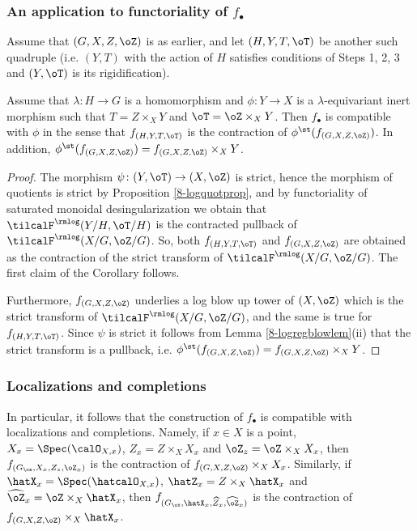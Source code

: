 \documentclass[10pt]{../fichiers-configuration-latex/smfart}
\begin{document}
\subsubsection{An application to functoriality of $f_\bullet$} Assume
that $(G,X,Z,\oZ)$ is as earlier, and let $(H,Y,T,\oT)$ be another
such quadruple (i.e. $(Y,T)$ with the action of $H$ satisfies
conditions of Steps 1, 2, 3 and $(Y,\oT)$ is its rigidification).

\begin{corollary2}\label{8-logquotcor} Assume that
$\lambda{\colon}H\to G$ is a homomorphism and $\phi{\colon}Y\to
X$ is a $\lambda$-equivariant inert morphism such that
$T=Z\times_XY$ and $\oT=\oZ\times_XY$. Then $f_\bullet$ is
compatible with $\phi$ in the sense that $f_{(H,Y,T,\oT)}$ is
the contraction of $\phi^\st(f_{(G,X,Z,\oZ)})$. In addition,
$\phi^\st(f_{(G,X,Z,\oZ)})=f_{(G,X,Z,\oZ)}\times_XY$.
\end{corollary2} \begin{proof} The morphism
$\psi{\colon}(Y,\oT)\to(X,\oZ)$ is strict, hence the morphism of
quotients is strict by Proposition \ref{8-logquotprop}, and by
functoriality of saturated monoidal desingularization we obtain
that $\tilcalF^\rmlog(Y/H,\oT/H)$ is the contracted pullback
of $\tilcalF^\rmlog(X/G,\oZ/G)$. So, both $f_{(H,Y,T,\oT)}$ and
$f_{(G,X,Z,\oZ)}$ are obtained as the contraction of the strict
transform of $\tilcalF^\rmlog(X/G,\oZ/G)$. The first claim of the
Corollary follows.

Furthermore, $f_{(G,X,Z,\oZ)}$ underlies a log blow
up tower of $(X,\oZ)$ which is the strict transform of
$\tilcalF^\rmlog(X/G,\oZ/G)$, and the same is true for
$f_{(H,Y,T,\oT)}$. Since $\psi$ is strict it follows from Lemma
\ref{8-logregblowlem}(ii) that the strict transform is a pullback,
i.e. $\phi^\st(f_{(G,X,Z,\oZ)})=f_{(G,X,Z,\oZ)}\times_XY$.
\end{proof}

\subsubsection{Localizations and completions}\label{8-generalizsec}
In particular, it follows that the construction of $f_\bullet$
is compatible with localizations and completions. Namely, if
$x\in X$ is a point, $X_x=\Spec(\calO_{X,x})$, $Z_x=Z\times_XX_x$
and $\oZ_z=\oZ\times_XX_x$, then $f_{(G_\ox,X_x,Z_z,\oZ_x)}$ is
the contraction of $f_{(G,X,Z,\oZ)}\times_XX_x$. Similarly, if
$\hatX_x=\Spec(\hatcalO_{X,x})$, $\hatZ_x=Z\times_X\hatX_x$
and $\widehat{\oZ}_x=\oZ\times_X\hatX_x$, then
$f_{(G_\ox,\hatX_x,\widehat{Z}_x,\widehat{\oZ}_x)}$ is the
contraction of $f_{(G,X,Z,\oZ)}\times_X\hatX_x$.
\end{document}
